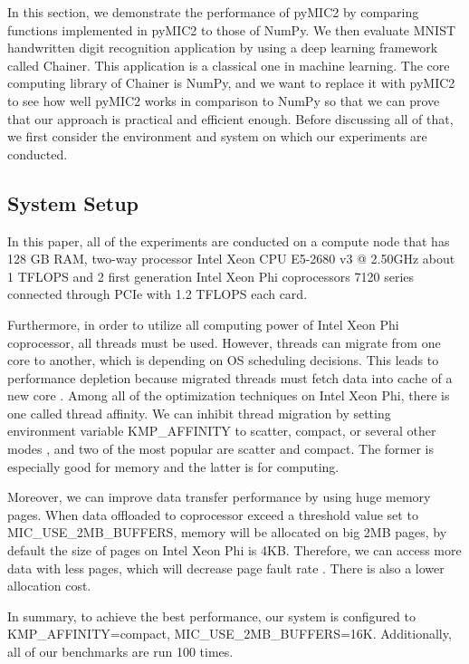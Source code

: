 In this section, we demonstrate the performance of pyMIC2 by comparing functions implemented in pyMIC2 to those of NumPy. We then evaluate MNIST handwritten digit recognition application by using a deep learning framework called Chainer. This application is a classical one in machine learning. The core computing library of Chainer is NumPy, and we want to replace it with pyMIC2 to see how well pyMIC2 works in comparison to NumPy so that we can prove that our approach is practical and efficient enough. Before discussing all of that, we first consider the environment and system on which our experiments are conducted.

\subsection{System Setup}
In this paper, all of the experiments are conducted on a compute node that has 128 GB RAM, two-way processor Intel Xeon CPU E5-2680 v3 @ 2.50GHz about 1 TFLOPS and 2 first generation Intel Xeon Phi coprocessors 7120 series connected through PCIe with 1.2 TFLOPS each card.

Furthermore, in order to utilize all computing power of Intel Xeon Phi coprocessor, all threads must be used. However, threads can migrate from one core to another, which is depending on OS scheduling decisions. This leads to performance depletion because migrated threads must fetch data into cache of a new core \cite{colfaxbook}. Among all of the optimization techniques on Intel Xeon Phi, there is one called thread affinity. We can inhibit thread migration by setting environment variable KMP\_AFFINITY to scatter, compact, or several other modes \cite{threadaffinity}, and two of the most popular are scatter and compact. The former is especially good for memory and the latter is for computing.

Moreover, we can improve data transfer performance by using huge memory pages. When data offloaded to coprocessor exceed a threshold value set to MIC\_USE\_2MB\_BUFFERS, memory will be allocated on big 2MB pages, by default the size of pages on Intel Xeon Phi is 4KB. Therefore, we can access more data with less pages, which will decrease page fault rate \cite{bigmempage}. There is also a lower allocation cost.


In summary, to achieve the best performance, our system is configured to KMP\_AFFINITY=compact, MIC\_USE\_2MB\_BUFFERS=16K. Additionally,  all of our benchmarks are run 100 times.

